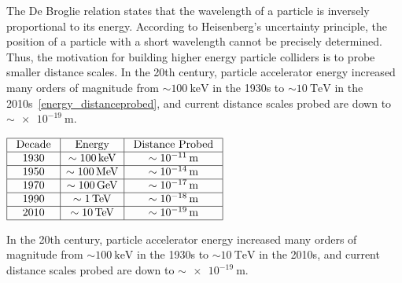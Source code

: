 The De Broglie relation states that the wavelength of a particle is inversely proportional to its energy.
According to Heisenberg's uncertainty principle, the position of a particle with a short wavelength cannot be precisely determined.
Thus, the motivation for building higher energy particle colliders is to probe smaller distance scales.
In the 20th century, particle accelerator energy increased many orders of magnitude from $\sim \SI{100}{\keV}$ in the 1930s to $\sim \SI{10}{\TeV}$ in the 2010s~\ref{energy_distanceprobed}, and current distance scales probed are down to $\sim \SI{e-19}{\m}$.
\begin{table}[!h]
\begin{center}
\begin{math}
\begin{array}{|c|c|c|}
\hline \text { Decade } & \text { Energy } & \text { Distance Probed } \\
\hline 1930 & \sim \SI{100}{\keV} & \sim \SI{e-11}{\m} \\
\hline 1950 & \sim \SI{100}{\MeV} & \sim \SI{e-14}{\m} \\
\hline 1970 & \sim \SI{100}{\GeV} & \sim \SI{e-17}{\m} \\
\hline 1990 & \sim \SI{1}{\TeV} & \sim \SI{e-18}{\m} \\
\hline 2010 & \sim \SI{10}{\TeV} & \sim \SI{e-19}{\m} \\
\hline
\end{array}
\end{math}
\caption{In the 20th century, particle accelerator energy increased many orders of magnitude from $\sim \SI{100}{\keV}$ in the 1930s to $\sim \SI{10}{\TeV}$ in the 2010s, and current distance scales probed are down to $\sim \SI{e-19}{\m}$.
        }
\label{energy_distanceprobed}
\end{center}
\end{table}


